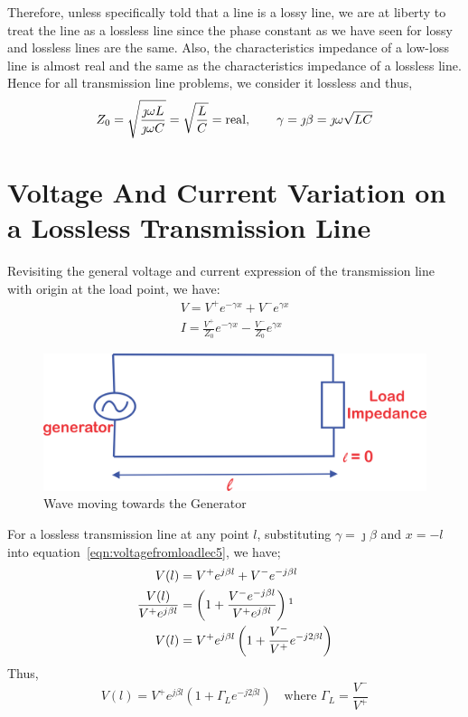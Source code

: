 Therefore, unless specifically told that a line is a lossy line, we are at liberty to treat the line as a lossless line since the phase constant as we have seen for lossy and lossless lines are the same. Also, the characteristics impedance of a low-loss line is almost real and the same as the characteristics impedance of a lossless line. Hence for all transmission line problems, we consider it lossless and thus, 
\begin{align*}
Z_0 = \sqrt{{\frac{\jmath\omega L}{\jmath\omega C}}} = \sqrt{\frac{L}{C}} = \textnormal{real}, \quad \quad \gamma= \jmath\beta = \jmath\omega\sqrt{LC}
\end{align*}

\section{Voltage And Current Variation on a Lossless Transmission Line}
Revisiting the general voltage and current expression of the transmission line with origin at the load point, we have:
\begin{align}
V = V^+ e^{- \gamma x} + V^- e^{\gamma x}
\label{eqn:voltagefromloadlec5}\\
I= \frac{V^+}{Z_0} e^{- \gamma x} - \frac{V^-}{Z_0} e^{\gamma x}
\label{eqn:currentfromloadlec5}
\end{align}
\begin{figure}[h]
\centering
\includegraphics[width=0.9\linewidth]{./graphics/11111111}
\caption{Wave moving towards the Generator}
\label{fig:11111111}
\end{figure}

For a lossless transmission line at any point $l$, substituting $\gamma = \jmath\beta$ and $x=-l$ into equation~\eqref{eqn:voltagefromloadlec5}, we have;
\begin{align*}
V(l) &= V^+ e^{j \beta l} + V^- e^{-j\beta l}\\
\frac{V(l)}{ V^+ e^{j \beta l}} &= \left(1 +\frac{V^- e^{- j \beta l}}{V^+ e^{j \beta l}}\right)\footnotemark\\
V(l) &= V^+ e^{j \beta l}\left(1+ \frac{V^-}{V^+}e^{-j 2 \beta l}\right)
\end{align*}
Thus,
\begin{equation}
V(l) = V^+ e^{j \beta l}(1 + \Gamma_L e^{-j 2 \beta l})\quad\text{where }\Gamma _L = \frac{V^-}{V^+}
\label{eqn:voltagefromloadlossless}
\end{equation}

